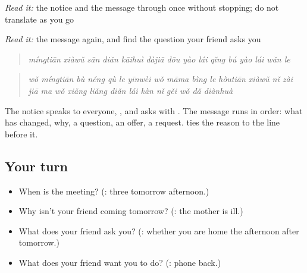 \begin{tcolorbox}[breakable,skin=enhanced,colback=orange!6,colframe=orange!45!black,boxrule=0.5pt,arc=1mm,left=6pt,right=6pt,top=4pt,bottom=4pt,fonttitle=\bfseries,title={Read this}]
\begin{quote}
  
\end{quote}

\begin{quote}
    
\end{quote}

\emph{Read it:} the notice and the message through once without stopping; do not translate as you go

\emph{Read it:} the message again, and find the question your friend asks you
\end{tcolorbox}

\begin{tcolorbox}[breakable,skin=enhanced,colback=orange!6,colframe=orange!45!black,boxrule=0.5pt,arc=1mm,left=6pt,right=6pt,top=4pt,bottom=4pt,fonttitle=\bfseries,title={Read this}]
\begin{quote}
\emph{míngtiān xiàwǔ sān diǎn kāihuì} \emph{dàjiā dōu yào lái} \emph{qǐng bú yào lái wǎn le}
\end{quote}

\begin{quote}
\emph{wǒ míngtiān bù néng qù le} \emph{yīnwèi wǒ māma bìng le} \emph{hòutiān xiàwǔ nǐ zài jiā ma} \emph{wǒ xiǎng liǎng diǎn lái kàn nǐ} \emph{gěi wǒ dǎ diànhuà}
\end{quote}

The notice speaks to everyone, , and asks with . The message runs in order: what has changed, why, a question, an offer, a request.  ties the reason to the line before it.
\end{tcolorbox}

\subsection*{Your turn}
\begin{itemize}
\raggedright
  \item When is the meeting? (\textbf{}: three tomorrow afternoon.)
  \item Why isn't your friend coming tomorrow? (\textbf{}: the mother is ill.)
  \item What does your friend ask you? (\textbf{}: whether you are home the afternoon after tomorrow.)
  \item What does your friend want you to do? (\textbf{}: phone back.)
\end{itemize}

